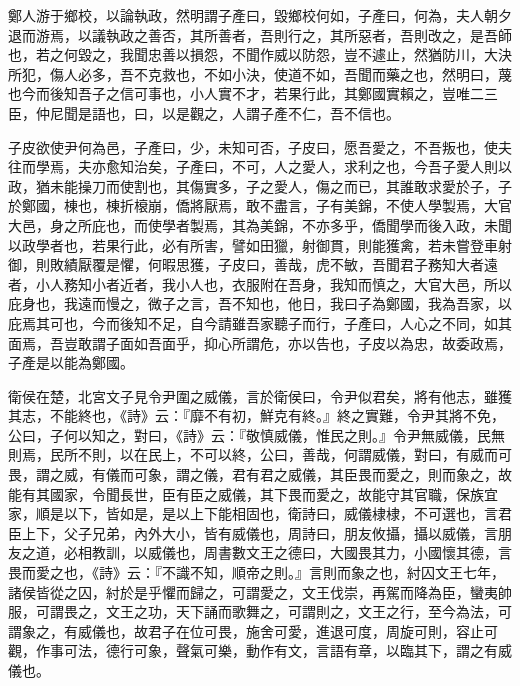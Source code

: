 \begin{pinyinscope}
鄭人游于鄉校，以論執政，然明謂子產曰，毀鄉校何如，子產曰，何為，夫人朝夕退而游焉，以議執政之善否，其所善者，吾則行之，其所惡者，吾則改之，是吾師也，若之何毀之，我聞忠善以損怨，不聞作威以防怨，豈不遽止，然猶防川，大決所犯，傷人必多，吾不克救也，不如小決，使道不如，吾聞而藥之也，然明曰，蔑也今而後知吾子之信可事也，小人實不才，若果行此，其鄭國實賴之，豈唯二三臣，仲尼聞是語也，曰，以是觀之，人謂子產不仁，吾不信也。

子皮欲使尹何為邑，子產曰，少，未知可否，子皮曰，愿吾愛之，不吾叛也，使夫往而學焉，夫亦愈知治矣，子產曰，不可，人之愛人，求利之也，今吾子愛人則以政，猶未能操刀而使割也，其傷實多，子之愛人，傷之而已，其誰敢求愛於子，子於鄭國，棟也，棟折榱崩，僑將厭焉，敢不盡言，子有美錦，不使人學製焉，大官大邑，身之所庇也，而使學者製焉，其為美錦，不亦多乎，僑聞學而後入政，未聞以政學者也，若果行此，必有所害，譬如田獵，射御貫，則能獲禽，若未嘗登車射御，則敗績厭覆是懼，何暇思獲，子皮曰，善哉，虎不敏，吾聞君子務知大者遠者，小人務知小者近者，我小人也，衣服附在吾身，我知而慎之，大官大邑，所以庇身也，我遠而慢之，微子之言，吾不知也，他日，我曰子為鄭國，我為吾家，以庇焉其可也，今而後知不足，自今請雖吾家聽子而行，子產曰，人心之不同，如其面焉，吾豈敢謂子面如吾面乎，抑心所謂危，亦以告也，子皮以為忠，故委政焉，子產是以能為鄭國。

衛侯在楚，北宮文子見令尹圍之威儀，言於衛侯曰，令尹似君矣，將有他志，雖獲其志，不能終也，《詩》云：『靡不有初，鮮克有終。』終之實難，令尹其將不免，公曰，子何以知之，對曰，《詩》云：『敬慎威儀，惟民之則。』令尹無威儀，民無則焉，民所不則，以在民上，不可以終，公曰，善哉，何謂威儀，對曰，有威而可畏，謂之威，有儀而可象，謂之儀，君有君之威儀，其臣畏而愛之，則而象之，故能有其國家，令聞長世，臣有臣之威儀，其下畏而愛之，故能守其官職，保族宜家，順是以下，皆如是，是以上下能相固也，衛詩曰，威儀棣棣，不可選也，言君臣上下，父子兄弟，內外大小，皆有威儀也，周詩曰，朋友攸攝，攝以威儀，言朋友之道，必相教訓，以威儀也，周書數文王之德曰，大國畏其力，小國懷其德，言畏而愛之也，《詩》云：『不識不知，順帝之則。』言則而象之也，紂囚文王七年，諸侯皆從之囚，紂於是乎懼而歸之，可謂愛之，文王伐崇，再駕而降為臣，蠻夷帥服，可謂畏之，文王之功，天下誦而歌舞之，可謂則之，文王之行，至今為法，可謂象之，有威儀也，故君子在位可畏，施舍可愛，進退可度，周旋可則，容止可觀，作事可法，德行可象，聲氣可樂，動作有文，言語有章，以臨其下，謂之有威儀也。


\end{pinyinscope}